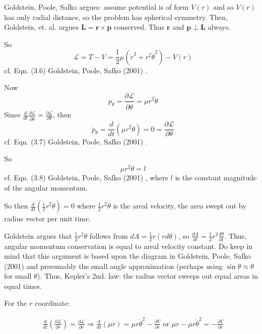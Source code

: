 \documentclass[10pt]{amsart}
\begin{document}
\begin{multicols*}{2}
Goldstein, Poole, Safko argues: assume potential is of form $V(r)$ and so $V(r)$ has only radial distance, so the problem has spherical symmetry. Then, Goldstein, et. al. argues $\mathbf{L} = \mathbf{r} \times \mathbf{p}$ conserved. Thus $\mathbf{r}$ and $\mathbf{p} \perp \mathbf{L}$ always. 

So 
\begin{equation}
\mathcal{L} = T- V = \frac{1}{2} \mu (\dot{r}^2 + r^2 \dot{\theta}^2 ) - V(r)
\end{equation}
cf. Eqn. (3.6) Goldstein, Poole, Safko (2001) \cite{GPS2001}.

Now
\[
p_{\theta} = \frac{ \partial \mathcal{L} }{ \partial \dot{\theta}} = \mu r^2 \dot{\theta}
\]
Since $\frac{d}{dt} \frac{\partial \mathcal{L}}{ \partial \dot{\theta} } = \frac{\partial \mathcal{L}}{\partial \theta}$, then
\begin{equation}
\dot{p}_{\theta} = \frac{d}{dt} ( \mu r^2 \dot{\theta} ) = 0 = \frac{\partial \mathcal{L}}{\partial \theta}
\end{equation}
cf. Eqn. (3.7)  Goldstein, Poole, Safko (2001) \cite{GPS2001}.

So 
\begin{equation}
\mu r^2 \dot{\theta} = l
\end{equation}
cf. Eqn. (3.8)  Goldstein, Poole, Safko (2001) \cite{GPS2001}, where $l$ is the constant magnitude of the angular momentum.

So then $\frac{d}{dt} \left( \frac{1}{2} r^2 \dot{\theta} \right) = 0$ where $\frac{1}{2} r^2 \dot{\theta}$ is the areal velocity, the area swept out by radius vector per unit time.

Goldstein argues that $\frac{1}{2} r^2 \dot{\theta}$ follows from $dA = \frac{1}{2} r(rd\theta)$, so $\frac{dA}{dt} = \frac{1}{2} r^2 \frac{d\theta}{dt}$. Thus, angular momentum conservation is equal to areal velocity constant. Do keep in mind that this argument is based upon the diagram in  Goldstein, Poole, Safko (2001) \cite{GPS2001} and presumably the small angle approximation (perhaps using $\sin{\theta} \approx \theta$ for small $\theta$). Thus, Kepler's 2nd. law: the radius vector sweeps out equal areas in equal times.

For the $r$ coordinate:

\[
\begin{gathered}
\frac{d}{dt} \left( \frac{ \partial \mathcal{L} }{ \partial \dot{r}} \right) = \frac{\partial \mathcal{L}}{\partial r} \Longrightarrow \frac{d}{dt} ( \mu \dot{r} ) = \mu r\dot{\theta}^2 - \frac{\partial V}{\partial r} \text{ or } \mu \ddot{r} - \mu r \dot{\theta}^2 = -\frac{\partial V}{\partial r}
\end{gathered}
\]


\end{multicols*}
\end{document}
